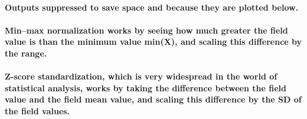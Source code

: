 \documentclass[11pt,]{article}
\newenvironment{Shaded}{\begin{snugshade}}{\end{snugshade}}
\newcommand{\CommentTok}[1]{\textcolor[rgb]{0.56,0.35,0.01}{\textit{#1}}}
\newcommand{\KeywordTok}[1]{\textcolor[rgb]{0.13,0.29,0.53}{\textbf{#1}}}
\newcommand{\NormalTok}[1]{#1}
\newcommand{\OperatorTok}[1]{\textcolor[rgb]{0.81,0.36,0.00}{\textbf{#1}}}
\newcommand{\StringTok}[1]{\textcolor[rgb]{0.31,0.60,0.02}{#1}}
\let\oldparagraph\paragraph
\renewcommand{\paragraph}[1]{\oldparagraph{#1}\mbox{}}
\begin{document}
\hypertarget{outputs-suppressed-to-save-space-and-because-they-are-plotted-below.}{%
\paragraph{Outputs suppressed to save space and because they are plotted
below.}\label{outputs-suppressed-to-save-space-and-because-they-are-plotted-below.}}

\hypertarget{minmax-normalization-works-by-seeing-how-much-greater-the-field-value-is-than-the-minimum-value-minx-and-scaling-this-difference-by-the-range.}{%
\paragraph{Min--max normalization works by seeing how much greater the
field value is than the minimum value min(X), and scaling this
difference by the
range.}\label{minmax-normalization-works-by-seeing-how-much-greater-the-field-value-is-than-the-minimum-value-minx-and-scaling-this-difference-by-the-range.}}

\begin{Shaded}
\end{Shaded}

\hypertarget{z-score-standardization-which-is-very-widespread-in-the-world-of-statistical-analysis-works-by-taking-the-difference-between-the-field-value-and-the-field-mean-value-and-scaling-this-difference-by-the-sd-of-the-field-values.}{%
\paragraph{Z-score standardization, which is very widespread in the
world of statistical analysis, works by taking the difference between
the field value and the field mean value, and scaling this difference by
the SD of the field
values.}\label{z-score-standardization-which-is-very-widespread-in-the-world-of-statistical-analysis-works-by-taking-the-difference-between-the-field-value-and-the-field-mean-value-and-scaling-this-difference-by-the-sd-of-the-field-values.}}
\end{document}
